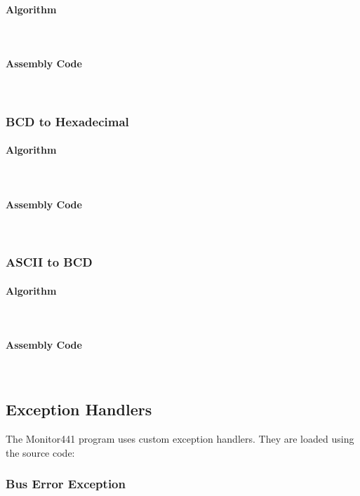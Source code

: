 \documentclass[12pt]{article}
\begin{document}
			\paragraph{Algorithm}~\\
			\paragraph{Assembly Code}~\\				
			
			\subsubsection{BCD to Hexadecimal}
			\paragraph{Algorithm}~\\
			\paragraph{Assembly Code}~\\				
			
			\subsubsection{ASCII to BCD}
			\paragraph{Algorithm}~\\
			\paragraph{Assembly Code}~\\				
			
			\subsection{Exception Handlers}
			The Monitor441 program uses custom exception handlers. They are loaded using the source code:
			
			\subsubsection{Bus Error Exception}
\end{document}
